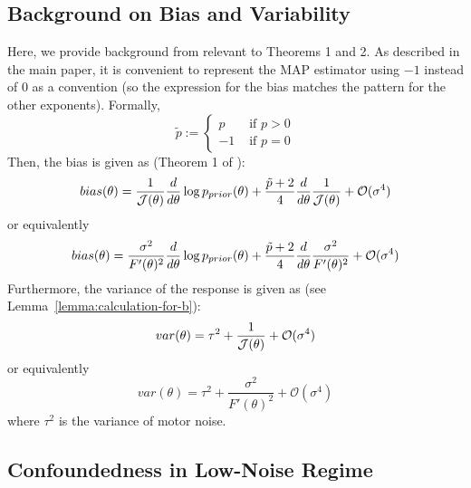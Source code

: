 \subsection{Background on Bias and Variability}\label{sec:background}
Here, we provide background from \cite{hahn2024unifying} relevant to Theorems 1 and 2.
As described in the main paper, it is convenient to represent the MAP estimator using $-1$ instead of $0$ as a convention (so the expression for the bias matches the pattern for the other exponents). Formally,
\begin{equation}\label{eq:tilde-p-also}
    \tilde{p} := \begin{cases} p &\text{ if } p > 0 \\ -1 & \text{ if } p=0\end{cases}
\end{equation}
Then, the bias is given as (Theorem 1 of \cite{hahn2024unifying}):
\begin{equation}\label{eq:bias-first-order}
bias(\theta) = \frac{1}{\mathcal{J}(\theta)} \frac{d}{d\theta} \log p_{prior}(\theta) + \frac{\tilde{p}+2}{4} \frac{d}{d\theta} \frac{1}{\mathcal{J}(\theta)}  + \mathcal{O}(\sigma^4)
\end{equation}
or equivalently
\begin{equation}\label{eq:bias-first-order-alt}
bias(\theta) = \frac{\sigma^2}{F'(\theta)^2} \frac{d}{d\theta} \log p_{prior}(\theta) + \frac{\tilde{p}+2}{4} \frac{d}{d\theta} \frac{\sigma^2}{F'(\theta)^2}  + \mathcal{O}(\sigma^4)
\end{equation}
Furthermore, the variance of the response is given as (see Lemma~\ref{lemma:calculation-for-b}):
\begin{equation}\label{eq:var-first-order}
    var(\theta) = \tau^2 + \frac{1}{\mathcal{J}(\theta)} + \mathcal{O}(\sigma^4)
\end{equation}
or equivalently
\begin{equation}\label{eq:var-first-order-alt}
    var(\theta) = \tau^2 + \frac{\sigma^2}{F'(\theta)^2} + \mathcal{O}(\sigma^4)
\end{equation}
where $\tau^2$ is the variance of motor noise.


\subsection{Confoundedness in Low-Noise Regime}

